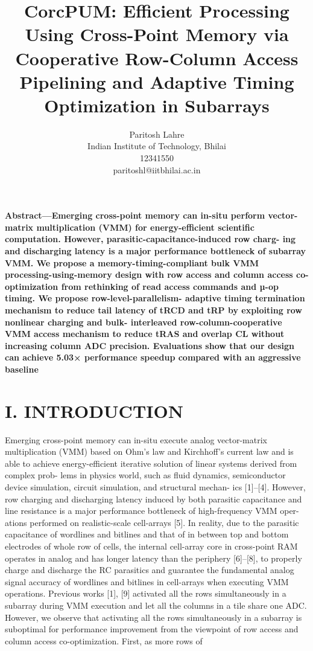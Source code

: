 \documentclass{article}
\title{\textbf{CorcPUM: Efficient Processing Using Cross-Point Memory
 	via Cooperative Row-Column Access Pipelining and Adaptive
 	Timing Optimization in Subarrays}}
\author{Paritosh Lahre \\ Indian Institute of Technology, Bhilai \\ 12341550 \\ paritoshl@iitbhilai.ac.in}
\date{}
\begin{document}
 	\maketitle
 	\textbf{Abstract—Emerging cross-point memory can in-situ perform
 		vector-matrix multiplication (VMM) for energy-efficient scientific
 		computation. However, parasitic-capacitance-induced row charg-
 		ing and discharging latency is a major performance bottleneck
 		of subarray VMM. We propose a memory-timing-compliant
 		bulk VMM processing-using-memory design with row access and
 		column access co-optimization from rethinking of read access
 		commands and µ-op timing. We propose row-level-parallelism-
 		adaptive timing termination mechanism to reduce tail latency of
 		tRCD and tRP by exploiting row nonlinear charging and bulk-
 		interleaved row-column-cooperative VMM access mechanism to
 		reduce tRAS and overlap CL without increasing column ADC
 		precision. Evaluations show that our design can achieve 5.03×
 		performance speedup compared with an aggressive baseline}
 	
 	\section*{I. INTRODUCTION}
 		Emerging cross-point memory can in-situ execute analog
 		vector-matrix multiplication (VMM) based on Ohm’s law and
 		Kirchhoff’s current law and is able to achieve energy-efficient
 		iterative solution of linear systems derived from complex prob-
 		lems in physics world, such as fluid dynamics, semiconductor
 		device simulation, circuit simulation, and structural mechan-
 		ics [1]–[4]. However, row charging and discharging latency
 		induced by both parasitic capacitance and line resistance is a
 		major performance bottleneck of high-frequency VMM oper-
 		ations performed on realistic-scale cell-arrays [5]. In reality,
 		due to the parasitic capacitance of wordlines and bitlines
 		and that of in between top and bottom electrodes of whole
 		row of cells, the internal cell-array core in cross-point RAM
 		operates in analog and has longer latency than the periphery
 		[6]–[8], to properly charge and discharge the RC parasitics and
 		guarantee the fundamental analog signal accuracy of wordlines
 		and bitlines in cell-arrays when executing VMM operations.
 		Previous works [1], [9] activated all the rows simultaneously
 		in a subarray during VMM execution and let all the columns
 		in a tile share one ADC. However, we observe that activating
 		all the rows simultaneously in a subarray is suboptimal for
 		performance improvement from the viewpoint of row access
 		and column access co-optimization. First, as more rows of
 		
\end{document}

